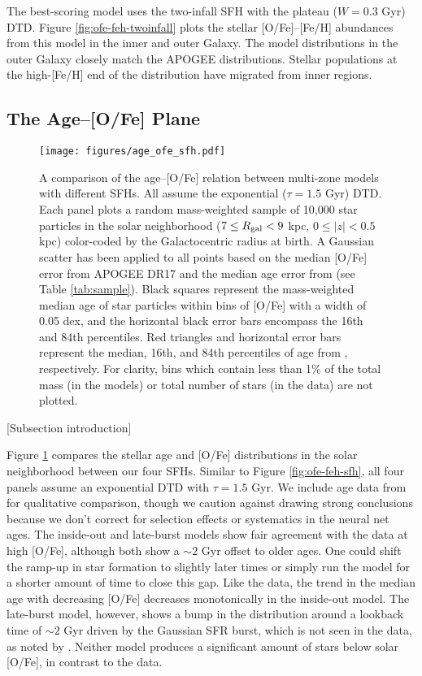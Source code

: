 \documentclass[twocolumn,twocolappendix,linenumbers,trackchanges]{aastex631}
\begin{document}
The best-scoring model uses the two-infall SFH with the plateau ($W=0.3$ Gyr) DTD. Figure \ref{fig:ofe-feh-twoinfall} plots the stellar [O/Fe]--[Fe/H] abundances from this model in the inner and outer Galaxy. The model distributions in the outer Galaxy closely match the APOGEE distributions. Stellar populations at the high-[Fe/H] end of the distribution have migrated from inner regions.

\subsection{The Age--[O/Fe] Plane}
\label{sec:age-ofe}

\begin{figure}
    \centering
    \texttt{[image: figures/age\_ofe\_sfh.pdf]}
    \caption{A comparison of the age--[O/Fe] relation between multi-zone models with different SFHs. All assume the exponential ($\tau=1.5$ Gyr) DTD. Each panel plots a random mass-weighted sample of 10,000 star particles in the solar neighborhood ($7\leq R_{\rm gal}<9$ kpc, $0\leq|z|<0.5$ kpc) color-coded by the Galactocentric radius at birth. A Gaussian scatter has been applied to all points based on the median [O/Fe] error from APOGEE DR17 and the median age error from  (see Table \ref{tab:sample}). Black squares represent the mass-weighted median age of star particles within bins of [O/Fe] with a width of 0.05 dex, and the horizontal black error bars encompass the 16th and 84th percentiles. Red triangles and horizontal error bars represent the median, 16th, and 84th percentiles of age from , respectively. For clarity, bins which contain less than 1\% of the total mass (in the models) or total number of stars (in the data) are not plotted.}
    \label{fig:age-ofe-sfh}
\end{figure}

[Subsection introduction]

Figure \ref{fig:age-ofe-sfh} compares the stellar age and [O/Fe] distributions in the solar neighborhood between our four SFHs. Similar to Figure \ref{fig:ofe-feh-sfh}, all four panels assume an exponential DTD with $\tau=1.5$ Gyr. We include age data from  for qualitative comparison, though we caution against drawing strong conclusions because we don't correct for selection effects or systematics in the neural net ages. The inside-out and late-burst models show fair agreement with the data at high [O/Fe], although both show a $\sim2$ Gyr offset to older ages. One could shift the ramp-up in star formation to slightly later times or simply run the model for a shorter amount of time to close this gap. Like the data, the trend in the median age with decreasing [O/Fe] decreases monotonically in the inside-out model. The late-burst model, however, shows a bump in the distribution around a lookback time of $\sim2$ Gyr driven by the Gaussian SFR burst, which is not seen in the data, as noted by . Neither model produces a significant amount of stars below solar [O/Fe], in contrast to the data.
\end{document}
